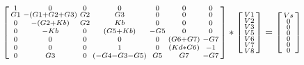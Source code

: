 \begin{equation}
\begin{bsmallmatrix}
1  & 0  & 0  & 0  & 0  & 0  & 0\\
G1  & -(G1 + G2 + G3)  & G2  & G3  & 0  & 0  & 0\\
0  & -(G2 + Kb)  & G2  & Kb  & 0  & 0  & 0\\
0  & -Kb  & 0  & (G5 + Kb)  & -G5  & 0  & 0\\
0  & 0  & 0  & 0  & 0  & (G6 + G7)  & -G7\\
0  & 0  & 0  & 1  & 0  & (Kd * G6)  & -1\\
0  & G3  & 0  & (-G4 - G3 - G5)  & G5  & G7  & -G7
\end{bsmallmatrix}
*
\begin{bsmallmatrix}
V1\\
V2\\
V3\\
V5\\
V6\\
V7\\
V8
\end{bsmallmatrix}
=
\begin{bsmallmatrix}
Vs\\
0\\
0\\
0\\
0\\
0\\
0
\end{bsmallmatrix}
\end{equation}

\vspace{20pt}

